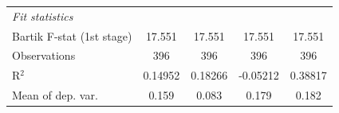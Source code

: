 \begin{tabular}{lcccc}
   \midrule
   \emph{Fit statistics}\\
   Bartik F-stat (1st stage)                                     & 17.551                             & 17.551                          & 17.551                               & 17.551\\  
   Observations                                                          & 396                                & 396                             & 396                                  & 396\\  
   R$^2$                                                                 & 0.14952                            & 0.18266                         & -0.05212                             & 0.38817\\  
   Mean of dep. var.                                                     & 0.159                              & 0.083                           & 0.179                                & 0.182\\  
\bottomrule
\end{tabular}
